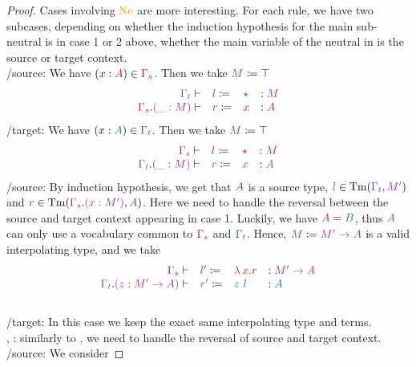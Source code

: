 \documentclass[a4paper,UKenglish,cleveref, autoref, thm-restate]{lipics-v2021}
\begin{document}
\begin{proof}
  Cases involving \(\Ne\) are more interesting. For each rule, we have two subcases,
  depending on whether the induction hypothesis for the main sub-neutral is
  in case 1 or 2 above, \ie whether the main variable of the neutral
  in is the source or target context.\\
  /source: We have \((x \ty \scol{A}) \in \scol{\Gamma_s}\).
  Then we take \(\mcol{M} \coloneq \top\)
  \[\begin{array}{rlll}
  \tcol{\Gamma_{t}} \vdash & \tcol{l} \coloneq & \tcol{\star} & \ty \mcol{M} \\
  \scol{\Gamma_{s}}.\mcol{(\_ : M)} \vdash & \scol{r} \coloneq &
    \scol{x} & \ty \scol{A}
  \end{array}\]
  /target: We have \((x \ty \tcol{A}) \in \tcol{\Gamma_t}\).
  Then we take \(\mcol{M} \coloneq \top\)
  \[\begin{array}{rlll}
  \scol{\Gamma_{s}} \vdash & \scol{l} \coloneq & \scol{\star} & \ty \mcol{M} \\
  \tcol{\Gamma_{t}}.\mcol{(\_ : M)} \vdash & \tcol{r} \coloneq &
    \tcol{x} & \ty \tcol{A}
  \end{array}\]
  /source: By induction hypothesis, we get that \(\scol{A}\)
    is a source type,
    \(\tcol{l} \in \Tm(\tcol{\Gamma_{t}},\mcol{M'})\) and
    \(\scol{r} \in \Tm(\scol{\Gamma_{s}}.\mcol{(x : M')}, \scol{A})\).
    Here we need to handle the reversal between the source and target
    context appearing in case 1.
    Luckily, we have \(\scol{A} = \tcol{B}\),
    thus \(\mcol{A}\) can only use a vocabulary common to
    \(\scol{\Gamma_s}\) and \(\tcol{\Gamma_t}\).
    Hence, \(\mcol{M} \coloneq \mcol{M' \to A}\) is a valid interpolating type,
    and we take
    \[\begin{array}{rlll}
      \scol{\Gamma_{s}} \vdash & \scol{l'} \coloneq & \scol{\l x.r} & \ty \mcol{M' \to A} \\
      \tcol{\Gamma_{t}}.\mcol{(z : M' \to A)} \vdash & \tcol{r'} \coloneq &
        \tcol{z~l} & \ty \tcol{A}
    \end{array}\]
  \\
  /target: In this case we keep the exact
    same interpolating type and terms.\\
  , : similarly to ,
    we need to handle the reversal of source and target context.\\
  /source: We consider

\end{proof}
\end{document}
